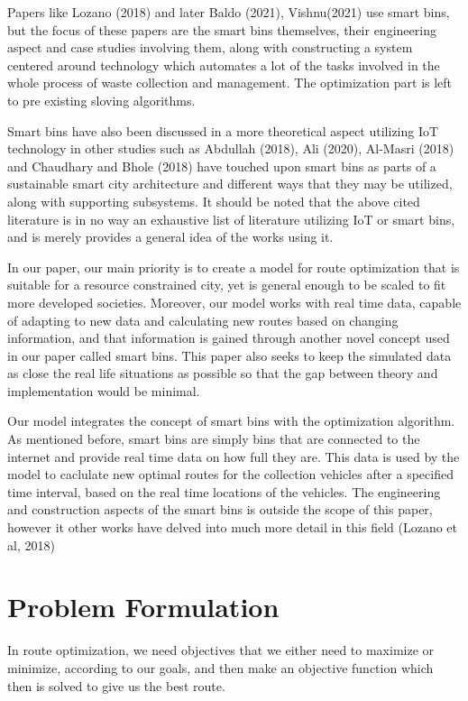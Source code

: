 \documentclass[12pt]{article}
\begin{document}
Papers like Lozano (2018) and later Baldo (2021), Vishnu(2021) use smart bins, but the focus of these papers are the smart bins themselves, their engineering aspect and case studies involving them, along with constructing a system centered around technology which automates a lot of the tasks involved in the whole process of waste collection and management. The optimization part is left to pre existing sloving algorithms.

Smart bins have also been discussed in a more theoretical aspect utilizing IoT technology in other studies such as Abdullah (2018), Ali (2020), Al-Masri (2018) and Chaudhary and Bhole (2018) have touched upon smart bins as parts of a sustainable smart city architecture and different ways that they may be utilized, along with supporting subsystems. It should be noted that the above cited literature is in no way an exhaustive list of literature utilizing IoT or smart bins, and is merely provides a general idea of the works using it.

In our paper, our main priority is to create a model for route optimization that is suitable for a resource constrained city, yet is general enough to be scaled to fit more developed societies. Moreover, our model works with real time data, capable of adapting to new data and calculating new routes based on changing information, and that information is gained through another novel concept used in our paper called smart bins. This paper also seeks to keep the simulated data as close the real life situations as possible so that the gap between theory and implementation would be minimal.

Our model integrates the concept of smart bins with the optimization algorithm. As mentioned before, smart bins are simply bins that are connected to the internet and provide real time data on how full they are. This data is used by the model to caclulate new optimal routes for the collection vehicles after a specified time interval, based on the real time locations of the vehicles. The engineering and construction aspects of the smart bins is outside the scope of this paper, however it other works have delved into much more detail in this field (Lozano et al, 2018)

\section{Problem Formulation}

In route optimization, we need objectives that we either need to maximize or minimize, according to our goals, and then make an objective function which then is solved to give us the best route. 
\end{document}
